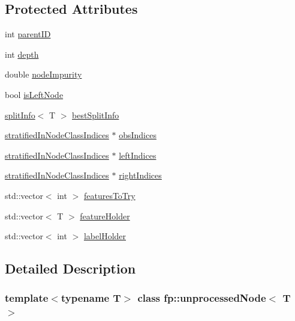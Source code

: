 \subsection*{Protected Attributes}
\begin{DoxyCompactItemize}
\item 
int \hyperlink{classfp_1_1unprocessedNode_a74cb75f76c24622444e531a583b75c3d}{parent\+ID}
\item 
int \hyperlink{classfp_1_1unprocessedNode_a22ebfbc35a57e2d30b81220c94f4d0d3}{depth}
\item 
double \hyperlink{classfp_1_1unprocessedNode_a5bb6906b09625f7893bf0ffd512b1714}{node\+Impurity}
\item 
bool \hyperlink{classfp_1_1unprocessedNode_a81b74c36ed1ac15d367e135e2fa0ba3d}{is\+Left\+Node}
\item 
\hyperlink{classfp_1_1splitInfo}{split\+Info}$<$ T $>$ \hyperlink{classfp_1_1unprocessedNode_ae60e5f84c9a80537cb84dfd17e70e893}{best\+Split\+Info}
\item 
\hyperlink{classfp_1_1stratifiedInNodeClassIndices}{stratified\+In\+Node\+Class\+Indices} $\ast$ \hyperlink{classfp_1_1unprocessedNode_aba9f03124658f62906fa8ded53cef535}{obs\+Indices}
\item 
\hyperlink{classfp_1_1stratifiedInNodeClassIndices}{stratified\+In\+Node\+Class\+Indices} $\ast$ \hyperlink{classfp_1_1unprocessedNode_a8e39fa0144bbb78fd02d1973bd05b5f6}{left\+Indices}
\item 
\hyperlink{classfp_1_1stratifiedInNodeClassIndices}{stratified\+In\+Node\+Class\+Indices} $\ast$ \hyperlink{classfp_1_1unprocessedNode_ac6886f626536370b1276374d4939291e}{right\+Indices}
\item 
std\+::vector$<$ int $>$ \hyperlink{classfp_1_1unprocessedNode_ab625569c5339dfbe93b487765f530313}{features\+To\+Try}
\item 
std\+::vector$<$ T $>$ \hyperlink{classfp_1_1unprocessedNode_ac2a435f6f38c5c0d2b4ba4b721fd5eaa}{feature\+Holder}
\item 
std\+::vector$<$ int $>$ \hyperlink{classfp_1_1unprocessedNode_a2aa2f9dcba0b0a859457ed22e147f698}{label\+Holder}
\end{DoxyCompactItemize}


\subsection{Detailed Description}
\subsubsection*{template$<$typename T$>$\newline
class fp\+::unprocessed\+Node$<$ T $>$}



